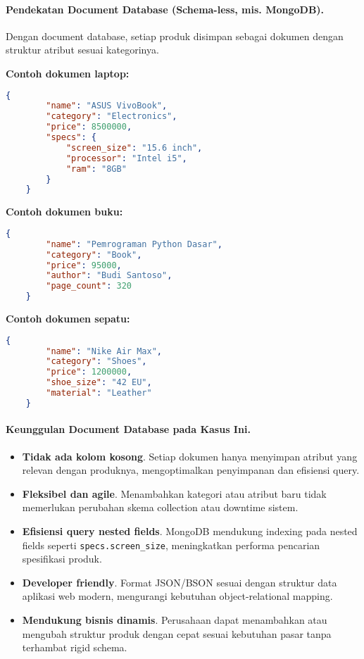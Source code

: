 \paragraph{Pendekatan Document Database (Schema-less, mis. MongoDB).}

Dengan document database, setiap produk disimpan sebagai dokumen dengan struktur atribut sesuai kategorinya.

\textbf{Contoh dokumen laptop:}

\begin{lstlisting}[language=json]
	{
		"name": "ASUS VivoBook",
		"category": "Electronics",
		"price": 8500000,
		"specs": {
			"screen_size": "15.6 inch",
			"processor": "Intel i5",
			"ram": "8GB"
		}
	}
\end{lstlisting}

\textbf{Contoh dokumen buku:}

\begin{lstlisting}[language=json]
	{
		"name": "Pemrograman Python Dasar",
		"category": "Book",
		"price": 95000,
		"author": "Budi Santoso",
		"page_count": 320
	}
\end{lstlisting}

\textbf{Contoh dokumen sepatu:}

\begin{lstlisting}[language=json]
	{
		"name": "Nike Air Max",
		"category": "Shoes",
		"price": 1200000,
		"shoe_size": "42 EU",
		"material": "Leather"
	}
\end{lstlisting}

\paragraph{Keunggulan Document Database pada Kasus Ini.}
\begin{itemize}
	\item \textbf{Tidak ada kolom kosong}. Setiap dokumen hanya menyimpan atribut yang relevan dengan produknya, mengoptimalkan penyimpanan dan efisiensi query.
	\item \textbf{Fleksibel dan agile}. Menambahkan kategori atau atribut baru tidak memerlukan perubahan skema collection atau downtime sistem.
	\item \textbf{Efisiensi query nested fields}. MongoDB mendukung indexing pada nested fields seperti \texttt{specs.screen\_size}, meningkatkan performa pencarian spesifikasi produk.
	\item \textbf{Developer friendly}. Format JSON/BSON sesuai dengan struktur data aplikasi web modern, mengurangi kebutuhan object-relational mapping.
	\item \textbf{Mendukung bisnis dinamis}. Perusahaan dapat menambahkan atau mengubah struktur produk dengan cepat sesuai kebutuhan pasar tanpa terhambat rigid schema.
\end{itemize}

